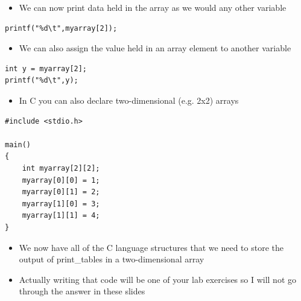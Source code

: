 \documentclass{beamer}
\begin{document}
\begin{frame}[fragile]
\begin{itemize}
\item We can now print data held in the array as we would any other variable
\end{itemize}

\begin{block}{}
\begin{lstlisting}
printf("%d\t",myarray[2]);
\end{lstlisting}
\end{block}

\begin{itemize}
\item We can also assign the value held in an array element to another variable
\end{itemize}
\begin{block}{}
\begin{lstlisting}
int y = myarray[2];
printf("%d\t",y);
\end{lstlisting}
\end{block}
\end{frame}
 
\begin{frame}[fragile]
\begin{itemize}
\item In C you can also declare two-dimensional (e.g. 2x2) arrays
\end{itemize}

\begin{block}{}
\begin{lstlisting}
#include <stdio.h>

main() 
{
    int myarray[2][2];
    myarray[0][0] = 1;
    myarray[0][1] = 2;
    myarray[1][0] = 3;
    myarray[1][1] = 4;
}
\end{lstlisting}
\end{block}
\end{frame}

 \begin{frame} 
\begin{itemize}
\item We now have all of the C language structures that we need to store the output of print\_tables in a two-dimensional array
\item Actually writing that code will be one of your lab exercises so I will not go through the answer in these  slides
\end{itemize}
 \end{frame}
 
\end{document}
